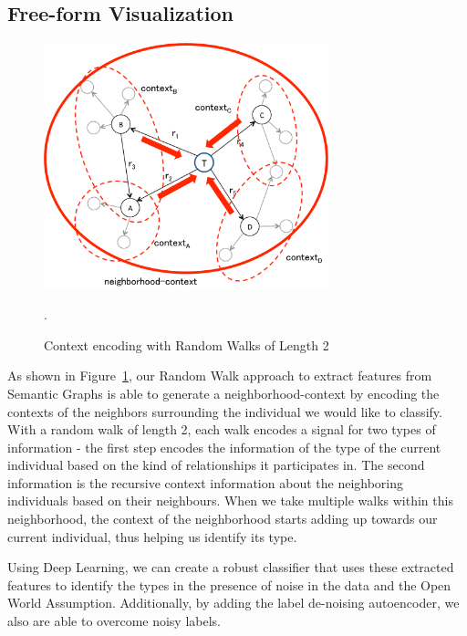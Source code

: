 \documentclass[runningheads,a4paper]{IEEEtran}
\begin{document}
\subsection{Free-form Visualization}
\begin{figure}[h]
\centering
\includegraphics[width=3.25in]{figures/context.pdf}
\caption{Context encoding with Random Walks of Length 2}
\label{context}.
\end{figure}
As shown in Figure~\ref{context}, our Random Walk approach to extract features from Semantic Graphs is able to generate a neighborhood-context by encoding the contexts of the neighbors surrounding the individual we would like to classify. With a random walk of length 2, each walk encodes a signal for two types of information - the first step encodes the information of the type of the current individual based on the kind of relationships it participates in. The second information is the recursive context information about the neighboring individuals based on their neighbours. When we take multiple walks within this neighborhood, the context of the neighborhood starts adding up towards our current individual, thus helping us identify its type.

Using Deep Learning, we can create a robust classifier that uses these extracted features to identify the types in the presence of noise in the data and the Open World Assumption. Additionally, by adding the label de-noising autoencoder, we also are able to overcome noisy labels.
\end{document}
